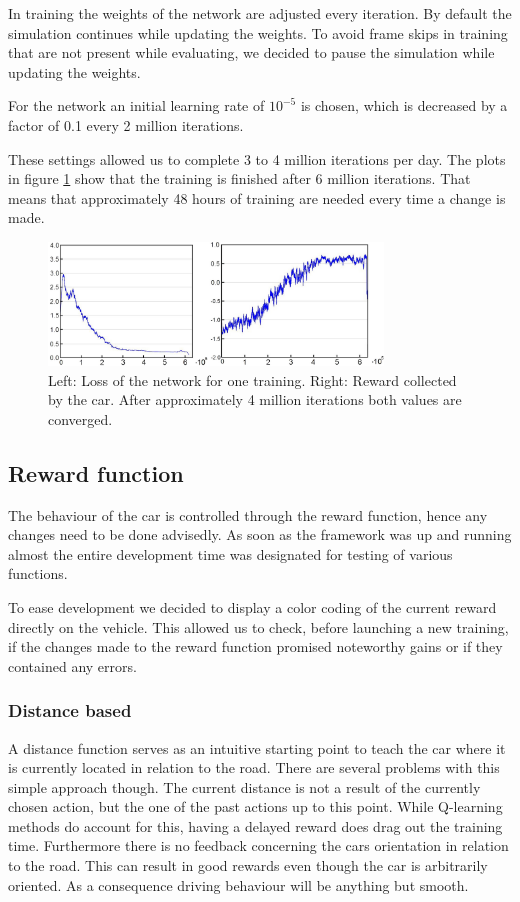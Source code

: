 In training the weights of the network are adjusted every iteration. By default the simulation continues while updating the weights. To avoid frame skips in training that are not present while evaluating, we decided to pause the simulation while updating the weights.

For the network an initial learning rate of $10^{-5}$ is chosen, which is decreased by a factor of 0.1 every 2 million iterations.

These settings allowed us to complete 3 to 4 million iterations per day. The plots in figure \ref{fig:lossandrew} show that the training is finished after 6 million iterations. That means that approximately 48 hours of training are needed every time a change is made.

\begin{figure}[!t]
\centering
\includegraphics[width=3.5in]{../presentation/both-plot.jpg} 
\caption{Left: Loss of the network for one training. Right: Reward collected by the car. After approximately 4 million iterations both values are converged.}
\label{fig:lossandrew}
\end{figure}
 

\subsection{Reward function}
The behaviour of the car is controlled through the reward function, hence any changes need to be done advisedly. As soon as the framework was up and running almost the entire development time was designated for testing of various functions. 

To ease development we decided to display a color coding of the current reward directly on the vehicle. This allowed us to check, before launching a new training, if the changes made to the reward function promised noteworthy gains or if they contained any errors. 
\subsubsection{Distance based}
A distance function serves as an intuitive starting point to teach the car where it is currently located in relation to the road. There are several problems with this simple approach though. The current distance is not a result of the currently chosen action, but the one of the past actions up to this point. While Q-learning methods do account for this, having a delayed reward does drag out the training time. Furthermore there is no feedback concerning the cars orientation in relation to the road. This can result in good rewards even though the car is arbitrarily oriented. As a consequence driving behaviour will be anything but smooth.
